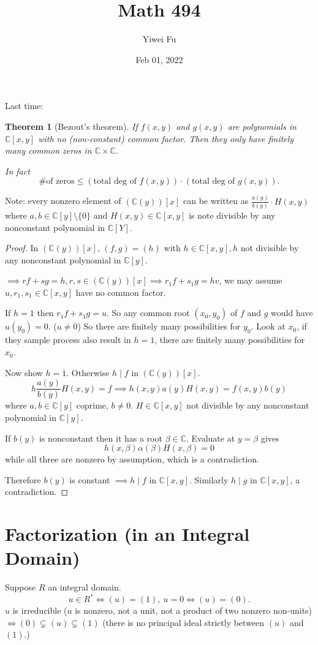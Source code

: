 \documentclass{article}
\newcommand{\C}{\mathbb{C}}
\newtheorem*{theorem}{Theorem}
\theoremstyle{definition}
\theoremstyle{remark}
\begin{document}
\title{Math 494}
\author{Yiwei Fu}
\date{Feb 01, 2022}
\maketitle

Last time:
\begin{theorem}[Bezout's theorem]
    If $f(x, y)$ and $g(x, y)$ are polynomials in $\C[x, y]$ with no (non-constant) common factor. Then they only have finitely many common zeros in $\C \times \C$.

    In fact \[\# \text{of zeros} \leq (\text{total deg of } f(x, y)) \cdot (\text{total deg of } g(x, y)).\]
\end{theorem}
Note: every nonzero element of $(\C(y))[x]$ can be written as $\frac{a(y)}{b(y)}\cdot H(x, y)$ where $a, b \in \C[y] \setminus \{0\}$ and $H(x, y) \in \C[x, y]$ is note divisible by any nonconstant polynomial in $\C[Y]$.

\begin{proof}
    In $(\C(y))[x]$, $(f, g) = (h)$ with $h \in \C[x, y], h$ not divisible by any nonconstant polynomial in $\C[y]$.

    $\implies rf + sg = h, r, s \in (\C(y))[x] \implies r_1f + s_1g = hv$, we may assume $u, r_1, s_1 \in \C[x, y]$ have no common factor. 

    If $h = 1$ then $r_1f + s_1g = u$. So any common root $(x_0, y_0)$ of $f$ and $g$ would have $u(y_0) = 0$. ($u \neq 0$) So there are finitely many possibilities for $y_0$. Look at $x_0$, if they sample process also result in $h = 1$, there are finitely many possibilities for $x_0$.

    Now show $h = 1$. Otherwise $h \mid f$ in $(\C(y))[x]$.
    \[
        h\frac{a(y)}{b(y)}H(x, y) = f \implies h(x,y)a(y)H(x,y) = f(x, y)b(y)
    \] where $a, b \in \C[y]$ coprime, $b \neq 0$. $H \in \C[x, y]$ not divisible by any nonconstant polynomial in $\C[y]$.

    If $b(y)$ is nonconstant then it has a root $\beta \in \C$. Evaluate at $y = \beta$ gives
    \[h(x, \beta) \alpha(\beta) H(x, \beta) = 0\]
    while all three are nonzero by assumption, which is a contradiction.

    Therefore $b(y)$ is constant $\implies h \mid f$ in $\C[x, y]$. Similarly $h \mid g$ in $\C[x, y]$, a contradiction.
\end{proof}


\section*{Factorization (in an Integral Domain)}
Suppose $R$ an integral domain.
\[u \in R^* \iff (u) = (1),\ u = 0 \iff (u) = (0).\]
$u$ is irreducible ($u$ is nonzero, not a unit, not a product of two nonzero non-units) $\iff (0) \subsetneq (u) \subsetneq (1)$ (there is no principal ideal strictly between $(u)$ and $(1)$.) 
\end{document}
